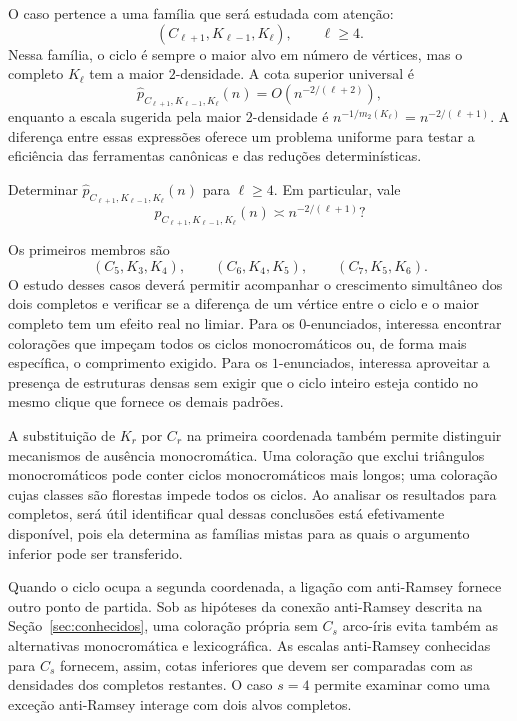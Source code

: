 \documentclass[11pt,a4paper]{article}
\theoremstyle{plain}
\theoremstyle{definition}
\newcounter{question}[section]
\renewcommand{\thequestion}{\thesection.\arabic{question}}
\newenvironment{question}[1][]{%
  \refstepcounter{question}%
  \begin{tcolorbox}[
    enhanced,
    colback=qbluebg,
    colframe=qblue,
    arc=4pt,
    boxrule=1.2pt,
    left=8pt, right=8pt, top=6pt, bottom=6pt,
    fonttitle=\bfseries\sffamily,
    title={\color{white}Pergunta~\thequestion\ifx&#1&\else\ (#1)\fi},
    coltitle=white,
    attach boxed title to top left={yshift=-2mm, xshift=6pt},
    boxed title style={colback=qblue, arc=3pt, boxrule=0pt},
  ]%
  \itshape
}{%
  \end{tcolorbox}%
}
\begin{document}
O caso pertence a uma família que será estudada com atenção:
\[
  (C_{\ell+1},K_{\ell-1},K_\ell),\qquad\ell\ge4.
\]
Nessa família, o ciclo é sempre o maior alvo em número de vértices,
mas o completo $K_\ell$ tem a maior $2$-densidade. A cota superior
universal é
\[
  \widehat p_{C_{\ell+1},K_{\ell-1},K_\ell}(n)
  =O(n^{-2/(\ell+2)}),
\]
enquanto a escala sugerida pela maior $2$-densidade é
$n^{-1/m_2(K_\ell)}=n^{-2/(\ell+1)}.$
A diferença entre essas expressões oferece um problema uniforme
para testar a eficiência das ferramentas canônicas e das reduções
determinísticas.

\begin{question}[uma família mista de referência]
  \label{q:familia-mista}
  Determinar
  $\widehat p_{C_{\ell+1},K_{\ell-1},K_\ell}(n)$ para
  $\ell\ge4$. Em particular, vale
  \[
    \widehat p_{C_{\ell+1},K_{\ell-1},K_\ell}(n)
    \asymp n^{-2/(\ell+1)}?
  \]
\end{question}

Os primeiros membros são
\[
  (C_5,K_3,K_4),\qquad
  (C_6,K_4,K_5),\qquad
  (C_7,K_5,K_6).
\]
O estudo desses casos deverá permitir acompanhar o crescimento
simultâneo dos dois completos e verificar se a diferença de um
vértice entre o ciclo e o maior completo tem um efeito real no
limiar. Para os $0$-enunciados, interessa encontrar colorações
que impeçam todos os ciclos monocromáticos ou, de forma mais
específica, o comprimento exigido. Para os $1$-enunciados,
interessa aproveitar a presença de estruturas densas sem exigir
que o ciclo inteiro esteja contido no mesmo clique que fornece
os demais padrões.

A substituição de $K_r$ por $C_r$ na primeira coordenada também
permite distinguir mecanismos de ausência monocromática. Uma
coloração que exclui triângulos monocromáticos pode conter ciclos
monocromáticos mais longos; uma coloração cujas classes são
florestas impede todos os ciclos. Ao analisar os resultados para
completos, será útil identificar qual dessas conclusões está
efetivamente disponível, pois ela determina as famílias mistas
para as quais o argumento inferior pode ser transferido.

Quando o ciclo ocupa a segunda coordenada, a ligação com
anti-Ramsey fornece outro ponto de partida. Sob as hipóteses da conexão anti-Ramsey descrita na Seção~\ref{sec:conhecidos}, uma coloração própria sem $C_s$
arco-íris evita também as alternativas monocromática e
lexicográfica. As escalas anti-Ramsey conhecidas para $C_s$
fornecem, assim, cotas inferiores que devem ser comparadas com
as densidades dos completos restantes. O caso $s=4$ permite
examinar como uma exceção anti-Ramsey interage com dois alvos
completos.
\end{document}
